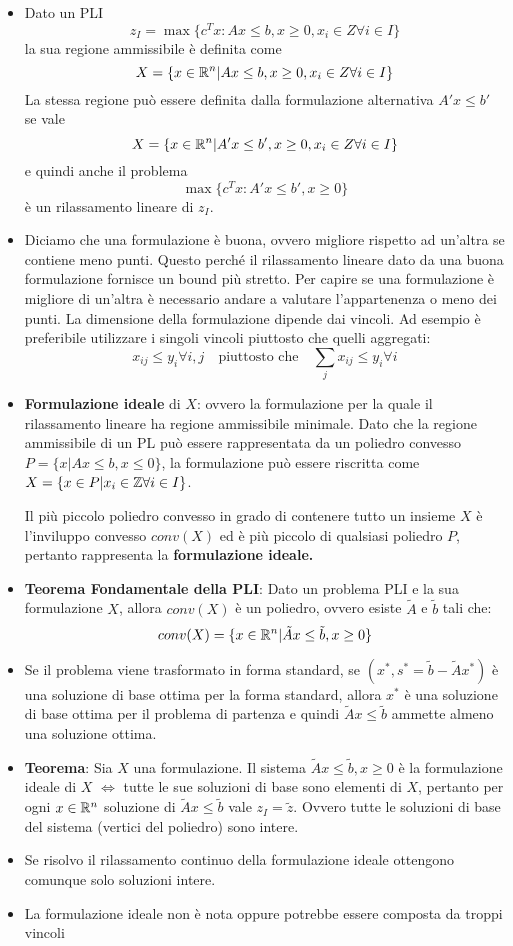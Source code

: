 \begin{itemize}
	\item Dato un PLI
	$$
	z_I = \max \{ c^Tx : Ax \leq b, x \geq 0, x_i \in Z \forall i \in I\}
	$$
	la sua regione ammissibile è definita come
	$$
	X = \{ x \in \mathbb{R}^n | Ax \leq b, x \geq 0, x_i \in Z \forall i \in I \}
	$$
	La stessa regione può essere definita dalla formulazione alternativa $A'x \leq b'$ se vale
	$$
	X = \{ x \in \mathbb{R}^n | A'x \leq b', x \geq 0, x_i \in Z \forall i \in I \}
	$$
	e quindi anche il problema
	$$
	\max \{ c^Tx: A'x \leq b', x\geq 0 \}
	$$
	è un rilassamento lineare di $z_I$.
	\item Diciamo che una formulazione è buona, ovvero migliore rispetto ad un'altra se contiene meno punti. Questo perché il rilassamento lineare dato da una buona formulazione fornisce un bound più stretto. Per capire se una formulazione è migliore di un'altra è necessario andare a valutare l'appartenenza o meno dei punti. La dimensione della formulazione dipende dai vincoli. Ad esempio è preferibile utilizzare i singoli vincoli piuttosto che quelli aggregati:
	$$
	x_{ij} \leq y_i \forall i,j \quad\text{piuttosto che}\quad \sum_{j}x_{ij}\leq y_i \forall i
	$$
	\item \textbf{Formulazione ideale} di $X$: ovvero la formulazione per la quale il rilassamento lineare ha regione ammissibile minimale.
	Dato che la regione ammissibile di un PL può essere rappresentata da un poliedro convesso $P = \{x | Ax \leq b, x \leq 0 \}$, la formulazione può essere riscritta come $X = \{ x \in P | x_i \in \mathbb{Z} \forall i \in I \}$.
	
	Il più piccolo poliedro convesso in grado di contenere tutto un insieme $X$ è l'inviluppo convesso $conv(X)$ ed è più piccolo di qualsiasi poliedro $P$, pertanto rappresenta la \textbf{formulazione ideale.}
	
	\item \textbf{Teorema Fondamentale della PLI}: Dato un problema PLI e la sua formulazione $X$, allora $conv(X)$ è un poliedro, ovvero esiste $\tilde{A}$ e $\tilde{b}$ tali che:
	$$
	conv(X) = \{ x \in \mathbb{R}^n | \tilde{A}x \leq \tilde{b}, x \geq 0 \}
	$$
	\item Se il problema viene trasformato in forma standard, se $(x^*, s^* = \tilde{b} - \tilde{A}x^*)$ è una soluzione di base ottima per la forma standard, allora $x^*$ è una soluzione di base ottima per il problema di partenza e quindi $\tilde{A}x \leq \tilde{b}$ ammette almeno una soluzione ottima.
	\item \textbf{Teorema}: Sia $X$ una formulazione. Il sistema $\tilde{A}x \leq \tilde{b}, x\geq 0$ è la formulazione ideale di $X$ $\Leftrightarrow$ tutte le sue soluzioni di base sono elementi di $X$, pertanto per ogni $x \in \mathbb{R}^n$ soluzione di $\tilde{A}x \leq \tilde{b}$ vale $z_I = \tilde{z}$. Ovvero tutte le soluzioni di base del sistema (vertici del poliedro) sono intere.
	\item Se risolvo il rilassamento continuo della formulazione ideale ottengono comunque solo soluzioni intere.
	\item La formulazione ideale non è nota oppure potrebbe essere composta da troppi vincoli
\end{itemize}

